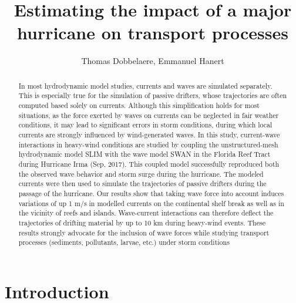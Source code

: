 \documentclass[11pt,a4paper]{article}
\title{Estimating the impact of a major hurricane on transport processes}
\author{Thomas Dobbelaere, Emmanuel Hanert}
\begin{document}
\maketitle
\begin{abstract}
In most hydrodynamic model studies, currents and waves are simulated separately. This is especially true for the simulation of passive drifters, whose trajectories are often computed based solely on currents. Although this simplification holds for most situations, as the force exerted by waves on currents can be neglected in fair weather conditions, it may lead to significant errors in storm conditions, during which local currents are strongly influenced by wind-generated waves. In this study, current-wave interactions in heavy-wind conditions are studied by coupling the unstructured-mesh hydrodynamic model SLIM with the wave model SWAN in the Florida Reef Tract during Hurricane Irma (Sep. 2017). This coupled model successfully reproduced both the observed wave behavior and storm surge during the hurricane. The modeled currents were then used to simulate the trajectories of passive drifters during the passage of the hurricane. Our results show that taking wave force into account induces variations of up 1 m/s in modelled currents on the continental shelf break as well as in the vicinity of reefs and islands. Wave-current interactions can therefore deflect the trajectories of drifting material by up to 10 km during heavy-wind events. These results strongly advocate for the inclusion of wave forces while studying transport processes (sediments, pollutants, larvae, etc.) under storm conditions 

\end{abstract}

\section{Introduction}
\end{document}
